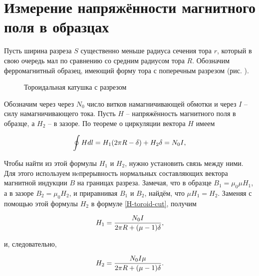 \section{Измерение напряжённости магнитного поля в образцах}

Пусть ширина разреза $S$ существенно меньше радиуса сечения тора $r$, который в свою очередь мал по сравнению со средним радиусом тора $R$. Обозначим ферромагнитный образец, имеющий форму тора с поперечным разрезом (рис. ).


\begin{wrapfigure}{r}{0.4\textwidth}
	\caption{Тороидальная катушка с разрезом}
\end{wrapfigure}

Обозначим через через $N_0$ число витков намагничивающей обмотки и через $I$ -- силу намагничивающего тока. Пусть $H$ -- напряжённость магнитного поля в образце, а $H_2$ -- в зазоре. По теореме о циркуляции вектора $H$ имеем


\begin{equation}
	\eqmark[H-toroid-cut]
	\oint {Hdl} = H_1 (2\pi R - \delta) + H_2 \delta  = N_0 I,
\end{equation}

Чтобы найти из этой формулы $H_1$ и $H_2$, нужно установить связь между ними. Для этого используем нeпрерывность нормальных составляющих вектора магнитной индукции $B$ на границах разреза. Замечая, что в образце $B_1 = \mu_0 \mu H_1$, а в зазоре $B_2 = \mu_0 H_2$, и приравнивая $B_1$ и $B_2$, найдём, что $\mu H_1 = H_2$. Заменяя с помощью этой формулы $H_2$ в формуле \eqref{H-toroid-cut}, получим


\begin{equation}
	\eqmark[H1-toroid-inside]
	H_1 = \frac{N_0 I}{2\pi R + (\mu - 1)\delta},
\end{equation}

и, следовательно,

\begin{equation}
	\eqmark[H2-toroid-gap]
	H_2 = \frac{N_0 I \mu}{2\pi R + (\mu - 1)\delta}.
\end{equation}

